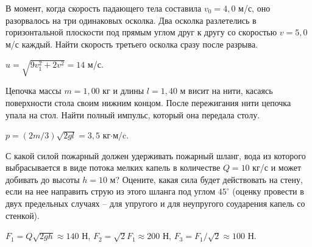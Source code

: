 \complexProblems

\begin{ex} %
В момент, когда скорость падающего тела составила $v_0 = 4,0$ м/с, оно разорвалось на три одинаковых осколка. Два осколка разлетелись в горизонтальной плоскости под прямым углом друг к другу со скоростью $v = 5,0$ м/с каждый. Найти скорость третьего осколка сразу после разрыва.
\begin{ans}
$u = \sqrt{9v_{1}^2 + 2v^2} = 14$ м/с.
\end{ans}
\end{ex}

\begin{ex} %
Цепочка массы $m = 1,00$ кг и длины $l = 1,40$ м висит на нити, касаясь поверхности стола своим нижним концом. После пережигания нити цепочка упала на стол. Найти полный импульс, который она передала столу.
\begin{ans}
$p = (2m/3)\sqrt{2gl} = 3,5$ кг$\cdot$м/c.
\end{ans}
\end{ex}

\begin{ex} %
С какой силой пожарный должен удерживать пожарный шланг, вода из которого выбрасывается в виде потока мелких капель в количестве $Q = 10$ кг/с и может добивать до высоты $h = 10$ м? Оцените, какая сила будет действовать на стену, если на нее направить струю из этого шланга под углом $45^{\circ}$ (оценку провести в двух предельных случаях -- для упругого и для неупругого соударения капель со стенкой).
\begin{ans}
$F_1 = Q\sqrt{2gh} \approx 140$ Н, $F_2 = \sqrt{2} F_1 \approx 200$ Н, $F_3 = F_1/\sqrt{2} \approx 100$ Н. 
\end{ans}
\end{ex}

\clearpage